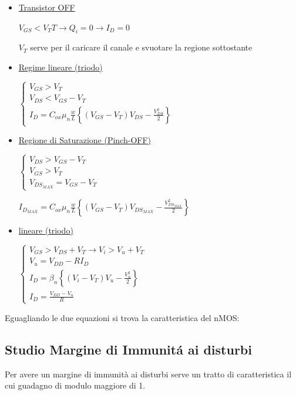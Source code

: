 \documentclass{article}
\begin{document}
\begin{itemize}
    \item \underline{Transistor OFF}

        $V_{GS} < V_TT \rightarrow Q_i = 0 \rightarrow I_D = 0$

        $V_T$ serve per il caricare il canale e svuotare la regione sottostante
    \item \underline{Regime lineare (triodo)}

        $\begin{cases}
            V_{GS} > V_T\\
            V_{DS} < V_{GS} - V_T\\
            I_D = C_{ox}\mu_n \frac{w}{L} \left\{ (V_{GS} - V_T) V_{DS} - \frac{V_{DS}^2}{2}\right\}
        \end{cases}$

    \item \underline{Regione di Saturazione (Pinch-OFF)}

        $\begin{cases}
            V_{DS} > V_{GS} - V_T \\
            V_{GS} > V_T \\
            V_{DS_{MAX}} = V_{GS} - V_T
        \end{cases}$

        $I_{D_{MAX}} = C_{ox} \mu_n \frac{w}{L} \left\{ (V_{GS} - V_T) V_{DS_{MAX}} - \frac{V_{DS_{MAX}}^2}{2}\right\}$
    \item \underline{lineare (triodo)}

        $\begin{cases}
            V_{GS} > V_{DS} + V_T \rightarrow V_i > V_u + V_T\\
            V_u = V_{DD} - R I_D\\
            I_D = \beta_n \left\{ (V_i - V_T) V_u - \frac{V_u^2}{2}\right\}\\
            I_D = \frac{V_{DD} - V_u}{R}
        \end{cases}$
\end{itemize}

Eguagliando le due equazioni si trova la caratteristica del nMOS:

\subsection{Studio Margine di Immunit\'a ai disturbi}
Per avere un margine di immunità ai disturbi serve un tratto di caratteristica il cui guadagno di modulo maggiore di 1.
\end{document}

